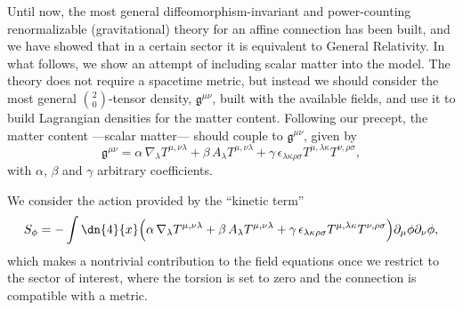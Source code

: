 \documentclass[aps,prl,twocolumn,superscriptaddress,showpacs,showkeys]{revtex4-1}
\begin{document}
Until now, the most general diffeomorphism-invariant and power-counting renormalizable (gravitational) theory for an affine connection has been built, and we have showed that in a certain sector it is equivalent to General Relativity. In what follows, we show an attempt of including scalar matter into the model. The theory does not require a spacetime metric, but instead we should consider the most general $\binom{2}{0}$-tensor density, $\mathfrak{g}^{\mu\nu}$,  built with the available fields, and use it to build Lagrangian densities for the matter content. Following our precept, the matter content ---scalar matter--- should couple to $\mathfrak{g}^{\mu\nu}$, given by %
\begin{dmath}
  \mathfrak{g}^{\mu\nu} = \alpha \, \nabla_\lambda T^{\mu,\nu\lambda} + \beta \, A_\lambda T^{\mu,\nu\lambda} + \gamma \, \epsilon_{\lambda\kappa\rho\sigma} T^{\mu, \lambda\kappa} T^{\nu, \rho\sigma},
\end{dmath}
with $\alpha$, $\beta$ and $\gamma$ arbitrary coefficients.

We consider the action provided by the ``kinetic term''
\begin{dmath}
  \label{ScalarAction}
  S_\phi = -  \int \dn{4}{x} \Big( \alpha \, \nabla_\lambda T^{\mu,\nu\lambda}  + \beta \, A_\lambda T^{\mu,\nu\lambda} + \gamma \, \epsilon_{\lambda\kappa\rho\sigma} T^{\mu, \lambda\kappa} T^{\nu, \rho\sigma} \Big) \partial_\mu\phi\partial_\nu\phi,
\end{dmath}
which makes a nontrivial contribution to the field equations once we restrict to the sector of interest, where the torsion is set to zero and the connection is compatible with a metric.
\end{document}
